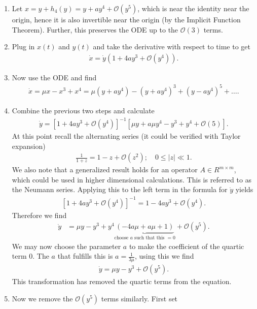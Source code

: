 \begin{ex}
	\begin{enumerate}
		\item 		
	Let $x =y + h_4(y)= y+ay^4 + \mathcal{O}(y^5) $, which is near the identity near the origin, hence it is also invertible near the origin (by the Implicit Function Theorem). Further, this preserves the ODE up to the $\mathcal{O}(3)$ terms.  
\item
	Plug in $x(t)$ and $y(t)$ and take the derivative with respect to time to get
	\begin{align}
		\dot{x} = \dot{y}(1+4ay^3 + \mathcal{O}(y^4)).
	\end{align}
\item 
Now use the ODE and find
\begin{align}
	\dot{x}=\mu x - x^3 +x^4 = \mu (y+ay^4)-(y+ay^4)^3 + (y-ay^4)^5 + \ldots.
\end{align}
\item
	Combine the previous two steps and calculate
\begin{align}
	\dot{y}= \left[1 + 4ay^3 + \mathcal{O}(y^4)\right]^{-1} \left[\mu y + a \mu y^4 - y^3+y^4 + \mathcal{O}(5)\right].	
\end{align}
At this point recall the alternating series (it could be verified with Taylor expansion)
\begin{align}
	\frac{1}{1+z} = 1-z + \mathcal{O}(z^2);\quad 0 \leq |z| \ll 1.
\end{align}
We also note that a generalized result holds for an operator $A \in R^{m \times m }$, which could be used in higher dimensional calculations. This is referred to as the Neumann series. Applying this to the left term in the formula for $\dot{y}$ yields
\begin{align}
	\left[1 + 4ay^3 + \mathcal{O}(y^4)\right]^{-1}=1 - 4ay^3 + \mathcal{O}(y^4). 
\end{align}
Therefore we find
\begin{align}
	\dot{y} &= \mu y - y^3 + y^4\underbrace{(-4a \mu  +a \mu +1)}_{ \textrm{choose }a  \textrm{ such that this }  =0} + \mathcal{O}(y^5).
\end{align}
We may now choose the parameter $a$ to make the coefficient of the quartic term 0. The $a$ that fulfills this is $a=\frac{1}{3 \mu }$, using this we find
\begin{align}
	\boxed{
		\dot{y} = \mu y-y^3+\mathcal{O}(y^5).
	}
\end{align}
This transformation has removed the quartic terms from the equation.
\item
	Now we remove the $\mathcal{O}(y^5)$ terms similarly. First set 

\end{enumerate}
\end{ex}
